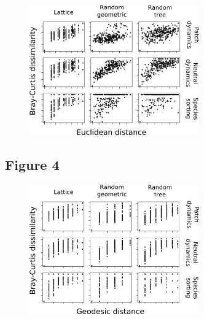 \documentclass[12pt]{article}
\begin{document}
\begin{figure}[ht!]
	\centering\includegraphics[width=0.65\textwidth]{BetaGeoDist.png}
\end{figure}

\newpage

\subsection*{Figure 4}

\begin{figure}[ht!]
	\centering\includegraphics[width=0.65\textwidth]{BetaTopoDist.png}
\end{figure}

\newpage

\end{document}
